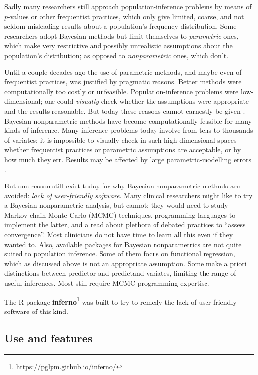 Sadly many researchers still approach population-inference problems by means of $p$-values or other frequentist practices, which only give limited, coarse, and not seldom misleading results about a population's frequency distribution. Some researchers adopt Bayesian methods but limit themselves to \emph{parametric} ones, which make very restrictive and possibly unrealistic assumptions about the population's distribution; as opposed to \emph{nonparametric} ones, which don't.

Until a couple decades ago the use of parametric methods, and maybe even of frequentist practices, was justified by pragmatic reasons. Better methods were computationally too costly or unfeasible. Population-inference problems were low-dimensional; one could \emph{visually} check whether the assumptions were appropriate and the results reasonable. But today these reasons cannot earnestly be given \citep{walker2010}. Bayesian nonparametric methods have become computationally feasible for many kinds of inference. Many inference problems today involve from tens to thousands of variates; it is impossible to visually check in such high-dimensional spaces whether frequentist practices or parametric assumptions are acceptable, or by how much they err. Results may be affected by large parametric-modelling errors \citep{draper1995}.

But one reason still exist today for why Bayesian nonparametric methods are avoided: \emph{lack of user-friendly software}. Many clinical researchers might like to try a Bayesian nonparametric analysis, but cannot: they would need to study Markov-chain Monte Carlo (MCMC) techniques, programming languages to implement the latter, and a read about plethora of debated practices to ``assess convergence''. Most clinicians do not have time to learn all this even if they wanted to. Also, available packages for Bayesian nonparametrics are not quite suited to population inference. Some of them focus on functional regression, which as discussed above is not an appropriate assumption. Some make a priori distinctions between predictor and predictand variates, limiting the range of useful inferences. Most still require MCMC programming expertise.

\medskip

The R-package \textbf{inferno}\footnote{\url{https://pglpm.github.io/inferno/}} was built to try to remedy the lack of user-friendly software of this kind.

\subsection*{Use and features}
\label{sec:features}

